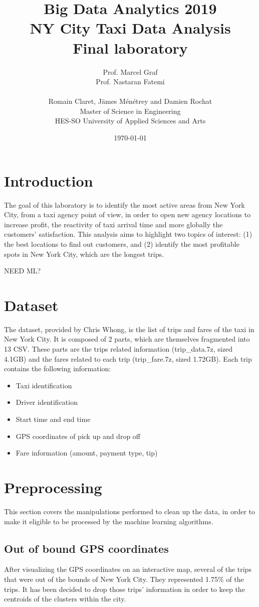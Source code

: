 ﻿\documentclass[a4paper]{article}
\title{
\Large{Big Data Analytics 2019}\\
\huge{NY City Taxi Data Analysis}\\
\large{Final laboratory}}
\author{
Prof. Marcel Graf\\
Prof. Nastaran Fatemi\\
\\
Romain Claret, Jämes Ménétrey and Damien Rochat\\
Master of Science in Engineering\\
HES-SO University of Applied Sciences and Arts
\date{\today}}
\begin{document}
\maketitle

\tableofcontents
\clearpage

\section{Introduction}
The goal of this laboratory is to identify the most active areas from New York City, from a taxi agency point of view, in order to open new agency locations to increase profit, the reactivity of taxi arrival time and more globally the customers' satisfaction. This analysis aims to highlight two topics of interest: (1) the best locations to find out customers, and (2) identify the most profitable spots in New York City, which are the longest trips.

NEED ML?


\section{Dataset}
The dataset, provided by Chris Whong, is the list of trips and fares of the taxi in New York City. It is composed of 2 parts, which are themselves fragmented into 13 CSV. These parts are the trips related information (trip\_data.7z, sized 4.1GB) and the fares related to each trip (trip\_fare.7z, sized 1.72GB). Each trip contains the following information:

\begin{itemize}
  \item Taxi identification
  \item Driver identification
  \item Start time and end time
  \item GPS coordinates of pick up and drop off
  \item Fare information (amount, payment type, tip)
\end{itemize}



\section{Preprocessing}
This section covers the manipulations performed to clean up the data, in order to make it eligible to be processed by the machine learning algorithms.


\subsection{Out of bound GPS coordinates}
After visualizing the GPS coordinates on an interactive map, several of the trips that were out of the bounds of New York City. They represented 1.75\% of the trips. It has been decided to drop those trips' information in order to keep the centroids of the clusters within the city.
\end{document}
